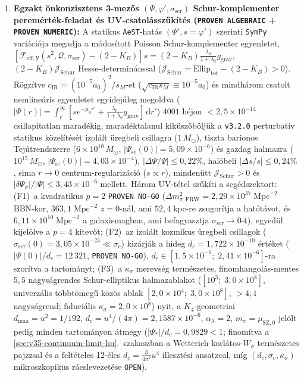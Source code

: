 \documentclass[11pt,a4paper]{article}
\begin{document}
{\begin{enumerate}
\item \textbf{Egzakt önkonzisztens 3-mezős $(\Psi,\varphi',\sigma_{\mathrm{scr}})$ Schur-komplementer peremérték-feladat és UV-csatolásszűkítés (\texttt{PROVEN ALGEBRAIC} + \texttt{PROVEN NUMERIC}):} A statikus \texttt{AeST}-hatás $(\Psi',s=\varphi')$ szerinti \texttt{SymPy} variációja megadja a módosított Poisson Schur-komplementer egyenletet, $[\mathcal{F}_{\mathrm{eff},\mathcal{Y}}(s^2,\mathcal{Q},\sigma_{\mathrm{scr}})-(2-K_B)]s = (2-K_B)\frac{\lambda_0}{1+\lambda_0}g_{\mathrm{grav}}$, $(2-K_B)\mathcal{J}_{\mathrm{Schur}}$ Hesse-determinánssal ($\mathcal{J}_{\mathrm{Schur}}=\mathrm{Ellip}_{\mathrm{tot}}-(2-K_B)>0$). Rögzítve $c_{\mathrm{IR}}=(10^{-5}a_0)^2/s_M$-et ($\sqrt{c_{\mathrm{IR}}s_M}\equiv 10^{-5}a_0$) és mindhárom csatolt nemlineáris egyenletet egyidejűleg megoldva ($|\Psi(r)|=\int_r^\infty[s e^{-\mu_0 r'}+\frac{\lambda_0}{1+\lambda_0}g_{\mathrm{grav}}]\,\mathrm{d}r'$) $4001$ héjon $<2{,}5\times 10^{-14}$ csillapítatlan maradékig, maradéktalanul kiküszöböljük a \texttt{v3.2.0} perturbatív statikus közelítését izolált üregbeli csillagra ($1\,M_\odot$), tiszta barionos Tejútrendszerre ($6\times 10^{10}\,M_\odot$, $|\Psi_{\mathrm{sc}}(0)|=5{,}09\times 10^{-6}$) és gazdag halmazra ($10^{15}\,M_\odot$, $|\Psi_{\mathrm{sc}}(0)|=4{,}03\times 10^{-4}$), $|\Delta\Psi/\Psi|\le 0{,}22\%$, halóbeli $|\Delta s/s|\le 0{,}24\%$, sima $r\to 0$ centrum-regularizáció ($s\propto r$), mindenütt $\mathcal{J}_{\mathrm{Schur}}>0$ és $|\delta\Psi_\sigma|/|\Psi|\le 3{,}43\times 10^{-6}$ mellett. Három UV-tétel szűkíti a segédszektort: (F1)~a kvadratikus $p=2$ \texttt{PROVEN NO-GO} ($\Delta m_{\sigma,\mathrm{FRW}}^2 = 2{,}29\times 10^{37}\;\mathrm{Mpc}^{-2}$ BBN-kor, $363{,}1\;\mathrm{Mpc}^{-2}$ $z=0$-nál, ami $52{,}4\;\mathrm{kpc}$-re zsugorítja a hatótávot, és $6{,}11\times 10^{10}\;\mathrm{Mpc}^{-2}$ a galaxismagban, ami befagyasztja $\sigma_{\mathrm{scr}}\to 0$-t), egyedül kijelölve a $p=4$ kitevőt; (F2)~az izolált kozmikus üregbeli csillagok ($\sigma_{\mathrm{scr}}(0)=3{,}05\times 10^{-23}\ll\sigma_c$) kizárják a hideg $d_c=1{,}722\times 10^{-10}$ értéket ($|\Psi(0)|/d_c=12\,321$, \texttt{PROVEN NO-GO}), $d_c\in[1{,}5\times 10^{-6};\;2{,}41\times 10^{-6}]$-ra szorítva a tartományt; (F3)~a $\kappa_\sigma$ merevség természetes, finomhangolás-mentes $5{,}5$ nagyságrendes Schur-elliptikus halmazablakot ($[10^3;\;3{,}0\times 10^8]$, univerzális többtömegű közös ablak $[2{,}0\times 10^4;\;3{,}0\times 10^8]$, $>4{,}1$ nagyságrend; fiduciális $\kappa_\sigma=2{,}0\times 10^8$) nyit, a $K_4$-geometriai $d_{\max}=u^2=1/192$, $d_c=u^4/(4\pi)=2{,}1587\times 10^{-6}$, $\alpha_\lambda=2$, $m_\sigma=\mu_{\mathrm{SZ},0}$ jelölt pedig minden tartományon átmegy ($|\Psi_*|/d_c=0{,}9829<1$; finomítva a \ref{sec:v35-continuum-limit-hu}.~szakaszban a Wetterich korlátos-$W_\sigma$ természetes pajzzsal és a feltételes 12-éles $d_c=\frac{3}{4\pi^2}u^4$ illesztési ansatzcal, míg $(d_c,\sigma_c,\kappa_\sigma)$ mikroszkopikus rácslevezetése \texttt{OPEN}).
\end{enumerate}\par}
\end{document}
